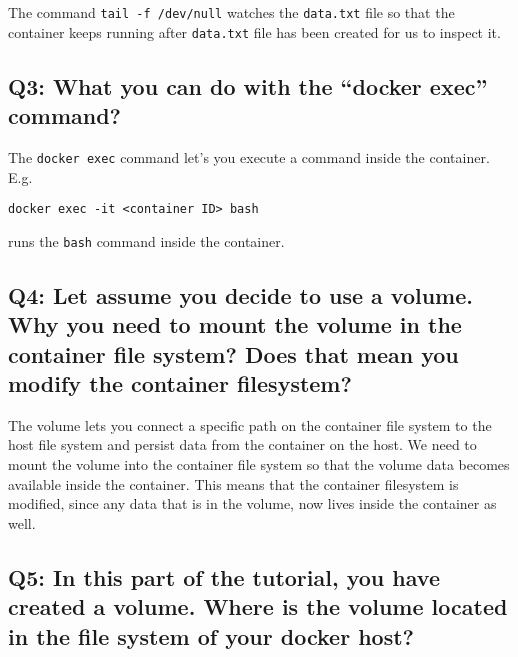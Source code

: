\documentclass[
]{article}
\begin{document}
The command \texttt{tail\ -f\ /dev/null} watches the \texttt{data.txt}
file so that the container keeps running after \texttt{data.txt} file
has been created for us to inspect it.

\hypertarget{q3-what-you-can-do-with-the-docker-exec-command}{%
\subsection{Q3: What you can do with the “docker exec”
command?}\label{q3-what-you-can-do-with-the-docker-exec-command}}

The \texttt{docker\ exec} command let’s you execute a command inside the
container. E.g.

\begin{verbatim}
docker exec -it <container ID> bash
\end{verbatim}

runs the \texttt{bash} command inside the container.

\hypertarget{q4-let-assume-you-decide-to-use-a-volume.-why-you-need-to-mount-the-volume-in-the-container-file-system-does-that-mean-you-modify-the-container-filesystem}{%
\subsection{Q4: Let assume you decide to use a volume. Why you need to
mount the volume in the container file system? Does that mean you modify
the container
filesystem?}\label{q4-let-assume-you-decide-to-use-a-volume.-why-you-need-to-mount-the-volume-in-the-container-file-system-does-that-mean-you-modify-the-container-filesystem}}

The volume lets you connect a specific path on the container file system
to the host file system and persist data from the container on the host.
We need to mount the volume into the container file system so that the
volume data becomes available inside the container. This means that the
container filesystem is modified, since any data that is in the volume,
now lives inside the container as well.

\hypertarget{q5-in-this-part-of-the-tutorial-you-have-created-a-volume.-where-is-the-volume-located-in-the-file-system-of-your-docker-host}{%
\subsection{Q5: In this part of the tutorial, you have created a volume.
Where is the volume located in the file system of your docker
host?}\label{q5-in-this-part-of-the-tutorial-you-have-created-a-volume.-where-is-the-volume-located-in-the-file-system-of-your-docker-host}}
\end{document}
